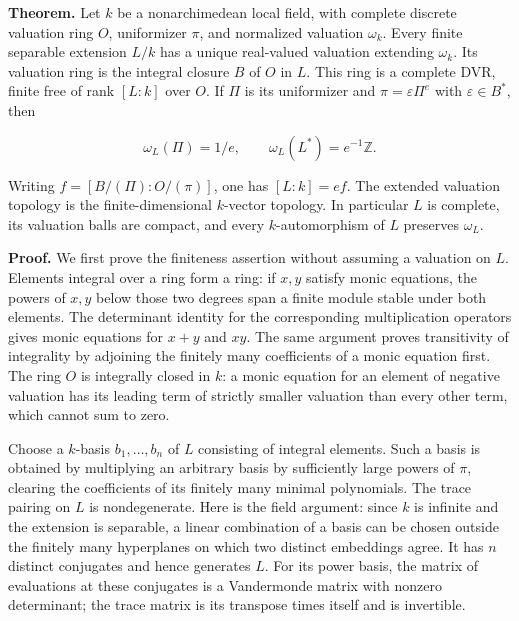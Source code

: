 \documentclass[
  11pt,
]{article}
\begin{document}
\textbf{Theorem.} Let \(k\) be a nonarchimedean local field, with
complete discrete valuation ring \(O\), uniformizer \(\pi\), and
normalized valuation \(\omega_k\). Every finite separable extension
\(L/k\) has a unique real-valued valuation extending \(\omega_k\). Its
valuation ring is the integral closure \(B\) of \(O\) in \(L\). This
ring is a complete DVR, finite free of rank \([L:k]\) over \(O\). If
\(\Pi\) is its uniformizer and \(\pi=\varepsilon\Pi^e\) with
\(\varepsilon\in B^*\), then

\[
 \omega_L(\Pi)=1/e,\qquad \omega_L(L^*)=e^{-1}\mathbb Z.
 \tag{AB.1}
\]

Writing \(f=[B/(\Pi):O/(\pi)]\), one has \([L:k]=ef\). The extended
valuation topology is the finite-dimensional \(k\)-vector topology. In
particular \(L\) is complete, its valuation balls are compact, and every
\(k\)-automorphism of \(L\) preserves \(\omega_L\).

\textbf{Proof.} We first prove the finiteness assertion without assuming
a valuation on \(L\). Elements integral over a ring form a ring: if
\(x,y\) satisfy monic equations, the powers of \(x,y\) below those two
degrees span a finite module stable under both elements. The determinant
identity for the corresponding multiplication operators gives monic
equations for \(x+y\) and \(xy\). The same argument proves transitivity
of integrality by adjoining the finitely many coefficients of a monic
equation first. The ring \(O\) is integrally closed in \(k\): a monic
equation for an element of negative valuation has its leading term of
strictly smaller valuation than every other term, which cannot sum to
zero.

Choose a \(k\)-basis \(b_1,\ldots,b_n\) of \(L\) consisting of integral
elements. Such a basis is obtained by multiplying an arbitrary basis by
sufficiently large powers of \(\pi\), clearing the coefficients of its
finitely many minimal polynomials. The trace pairing on \(L\) is
nondegenerate. Here is the field argument: since \(k\) is infinite and
the extension is separable, a linear combination of a basis can be
chosen outside the finitely many hyperplanes on which two distinct
embeddings agree. It has \(n\) distinct conjugates and hence generates
\(L\). For its power basis, the matrix of evaluations at these
conjugates is a Vandermonde matrix with nonzero determinant; the trace
matrix is its transpose times itself and is invertible.
\end{document}
